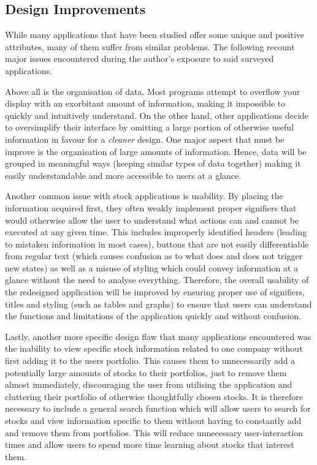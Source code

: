 \documentclass{sigchi}
\begin{document}
\subsection{Design Improvements}
While many applications that have been studied offer some unique and positive attributes, many of them suffer from similar problems. The following recount major issues encountered during the author's exposure to said surveyed applications. \par
Above all is the organisation of data. Most programs attempt to overflow your display with an exorbitant amount of information, making it impossible to quickly and intuitively understand. On the other hand, other applications decide to oversimplify their interface by omitting a large portion of otherwise useful information in favour for a \textit{cleaner} design. One major aspect that must be improve is the organisation of large amounts of information. Hence, data will be grouped in meaningful ways (keeping similar types of data together) making it easily understandable and more accessible to users at a glance. \par
Another common issue with stock applications is usability. By placing the information acquired first, they often weakly implement proper signifiers that would otherwise allow the user to understand what actions can and cannot be executed at any given time. This includes improperly identified headers (leading to mistaken information in most cases), buttons that are not easily differentiable from regular text (which causes confusion as to what does and does not trigger new states) as well as a misuse of styling which could convey information at a glance without the need to analyse everything. Therefore, the overall usability of the redesigned application will be improved by ensuring proper use of signifiers, titles and styling (such as tables and graphs) to ensure that users can understand the functions and limitations of the application quickly and without confusion. \par
Lastly, another more specific design flaw that many applications encountered was the inability to view specific stock information related to one company without first adding it to the users portfolio. This causes them to unnecessarily add a potentially large amounts of stocks to their portfolios, just to remove them almost immediately, discouraging the user from utilising the application and cluttering their portfolio of otherwise thoughtfully chosen stocks. It is therefore necessary to include a general search function which will allow users to search for stocks and view information specific to them without having to constantly add and remove them from portfolios. This will reduce unnecessary user-interaction times and allow users to spend more time learning about stocks that interest them. 
\end{document}
